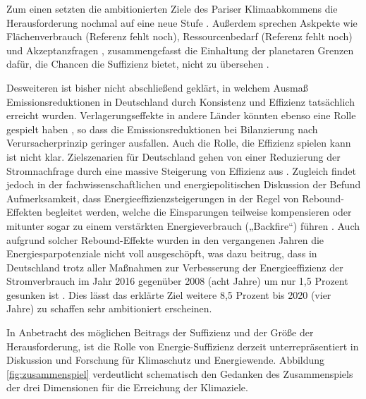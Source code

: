 \documentclass[a4paper,11pt,twoside]{scrartcl}
\begin{document}
Zum einen setzten die ambitionierten Ziele des Pariser Klimaabkommens die Herausforderung nochmal auf eine neue Stufe \cite{Rogelj2018}. Außerdem sprechen Askpekte wie Flächenverbrauch (Referenz fehlt noch), Ressourcenbedarf (Referenz fehlt noch) und Akzeptanzfragen \cite{Fuchs2016}, zusammengefasst die Einhaltung der planetaren Grenzen \cite{Rockstroem2009} dafür, die Chancen die Suffizienz bietet, nicht zu übersehen \cite{SAMADI2017}.

Desweiteren ist bisher nicht abschließend geklärt, in welchem Ausmaß Emissionsreduktionen in Deutschland durch Konsistenz und Effizienz tatsächlich erreicht wurden. Verlagerungseffekte in andere Länder könnten ebenso eine Rolle gespielt haben \cite{Wiedmann2015}, so dass die Emissionsreduktionen bei Bilanzierung nach Verursacherprinzip geringer ausfallen. Auch die Rolle, die Effizienz spielen kann ist nicht klar. Zielszenarien für Deutschland gehen von einer Reduzierung der Stromnachfrage durch eine massive Steigerung von Effizienz aus \cite{BMWi2017}. Zugleich findet jedoch in der fachwissenschaftlichen und energiepolitischen Diskussion der Befund Aufmerksamkeit, dass Energieeffizienzsteigerungen in der Regel von Rebound-Effekten begleitet werden, welche die Einsparungen teilweise kompensieren oder mitunter sogar zu einem verstärkten Energieverbrauch („Backfire“) führen \cite{DeutscherBundestag2013,Santarius2012}. Auch aufgrund solcher Rebound-Effekte wurden in den vergangenen Jahren die Energiesparpotenziale nicht voll ausgeschöpft, was dazu beitrug, dass in Deutschland trotz aller Maßnahmen zur Verbesserung der Energieeffizienz der Stromverbrauch im Jahr 2016 gegenüber 2008 (acht Jahre) um nur 1,5 Prozent gesunken ist \cite{UBA2017}. Dies lässt das erklärte Ziel weitere 8,5 Prozent bis 2020 (vier Jahre) zu schaffen sehr ambitioniert erscheinen.

In Anbetracht des möglichen Beitrags der Suffizienz und der Größe der Herausforderung, ist die Rolle von Energie-Suffizienz derzeit unterrepräsentiert in Diskussion und Forschung für Klimaschutz und Energiewende. Abbildung \ref{fig:zusammenspiel} verdeutlicht schematisch den Gedanken des Zusammenspiels der drei Dimensionen für die Erreichung der Klimaziele. 
\end{document}
